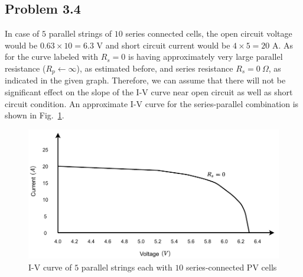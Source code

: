\subsection*{Problem 3.4}
In case of $5$ parallel strings of $10$ series connected cells, the open circuit voltage would be $0.63\times 10 = 6.3$ V and short circuit current would be $4\times 5 = 20$ A. As for the curve labeled with $R_s=0$ is having approximately very large parallel resistance ($R_p \leftarrow \infty$), as estimated before, and series resistance $R_s=0\ \Omega$, as indicated in the given graph. Therefore, we can assume that there will not be significant effect on the slope of the I-V curve near open circuit as well as short circuit condition. An approximate I-V curve for the series-parallel combination is shown in Fig.~\ref{fig:q3_4_iv_curve}.
\begin{figure}[h]
	\centering
	\includegraphics[scale=1.0,trim={0cm 0cm 0cm 0cm},clip]{./q3_4_iv_curve.pdf}
	\caption{I-V curve of $5$ parallel strings each with $10$ series-connected PV cells}
	\label{fig:q3_4_iv_curve}
\end{figure}